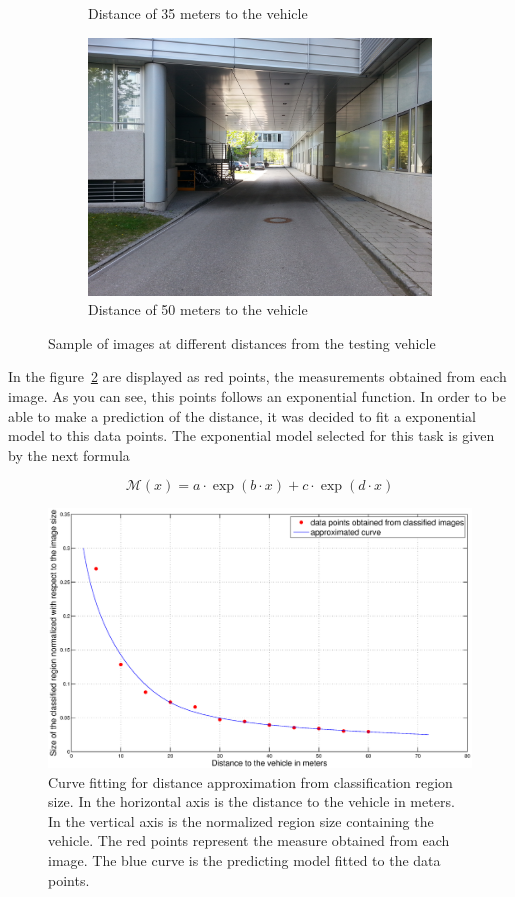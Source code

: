 \begin{figure}[t]
\begin{subfigure}[b]{0.5\textwidth}
\caption{Distance of 35 meters to the vehicle}
\end{subfigure}
\begin{subfigure}[b]{0.5\textwidth}
\centering
\includegraphics[width=0.75\linewidth]{img/elwoplate50m.jpg}
\caption{Distance of 50 meters to the vehicle}
\end{subfigure}
\caption{Sample of images at different distances from the testing vehicle}
\label{fig:distance-pictures}
\end{figure}

In the figure~\ref{fig:distance-curve-fitting} are displayed as red points, the
measurements obtained from each image. As you can see, this points follows an
exponential function. In order to be able to make a prediction of the distance,
it was decided to fit a exponential model to this data points. The exponential
model selected for this task is given by the next formula

\begin{equation}
    \mathcal{M}(x) = a \cdot \exp(b \cdot x) + c \cdot \exp(d \cdot x)
    \label{eq:distance-curve-model}
\end{equation}

\begin{figure}[h]
\centering
\includegraphics[width=\linewidth]{img/fitted_curve.eps}
\caption{Curve fitting for distance approximation from classification region
    size. In the horizontal axis is the distance to the vehicle in meters.
In the vertical axis is the normalized region size containing the vehicle. The red
points represent the measure obtained from each image. The blue curve is the predicting model fitted to the data points.}
\label{fig:distance-curve-fitting}
\end{figure} 

